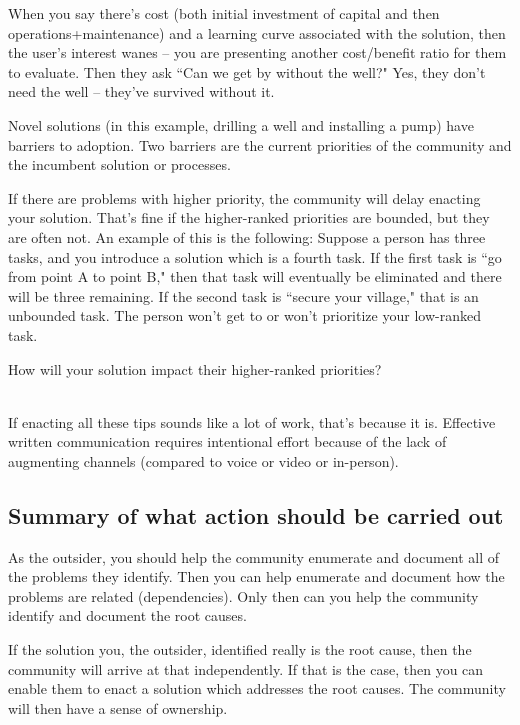 When you say there's cost (both initial investment of capital and then operations+maintenance) and a learning curve associated with the solution, then the user's interest wanes -- you are presenting another cost/benefit ratio for them to evaluate. Then they ask ``Can we get by without the well?" Yes, they don't need the well -- they've survived without it.

Novel solutions (in this example, drilling a well and installing a pump) have barriers to adoption. Two barriers are the current priorities of the community and the incumbent solution or processes.

If there are problems with higher priority, the community will delay enacting your solution. That's fine if the higher-ranked priorities are bounded, but they are often not. An example of this is the following:
Suppose a person has three tasks, and you introduce a solution which is a fourth task.
If the first task is ``go from point A to point B," then that task will eventually be eliminated and there will be three remaining.
If the second task is ``secure your village," that is an unbounded task. The person won't get to or won't prioritize your low-ranked task.

How will your solution impact their higher-ranked priorities?

\ \\

If enacting all these tips sounds like a lot of work, that's because it is. Effective written communication requires intentional effort because of the lack of augmenting channels (compared to voice or video or in-person). 




\subsection*{Summary of what action should be carried out} 

As the outsider, you should help the community enumerate and document all of the problems they identify. Then you can help enumerate and document how the problems are related (dependencies). Only then can you help the community identify and document the root causes.

If the solution you, the outsider, identified really is the root cause, then the community will arrive at that independently. If that is the case, then you can enable them to enact a solution which addresses the root causes. The community will then have a sense of ownership.
